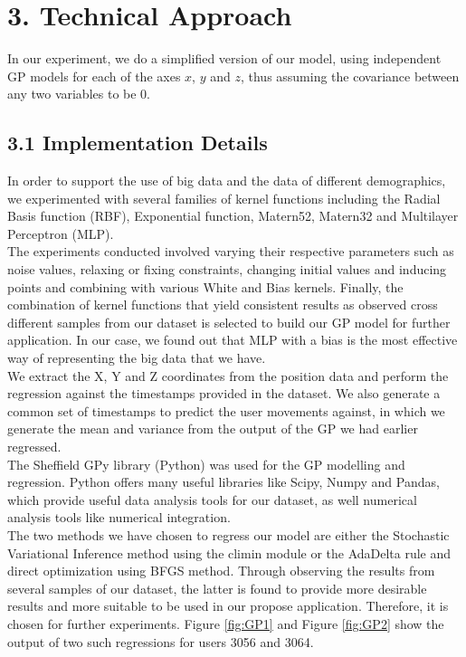 \documentclass[letterpaper]{article}
\begin{document}
\section{3.  Technical Approach}

In our experiment, we do a simplified version of our model, using independent GP models for each of the axes $x$, $y$ and $z$, thus assuming the covariance between any two variables to be $0$. 

\subsection{3.1  Implementation Details}

In order to support the use of big data and the data of different demographics, we experimented with several families of kernel functions including the Radial Basis function (RBF), Exponential function, Matern52, Matern32 and Multilayer Perceptron (MLP).\\

The experiments conducted involved varying their respective parameters such as noise values, relaxing or fixing constraints, changing initial values and inducing points and combining with various White and Bias kernels. Finally, the combination of kernel functions that yield consistent results as observed cross different samples from our dataset is selected to build our GP model for further application. In our case, we found out that MLP with a bias is the most effective way of representing the big data that we have.\\

We extract the X, Y and Z coordinates from the position data and perform the regression against the timestamps provided in the dataset. We also generate a common set of timestamps to predict the user movements against, in which we generate the mean and variance from the output of the GP we had earlier regressed. \\

The Sheffield GPy library (Python) was used for the GP modelling and regression. Python offers many useful libraries like Scipy, Numpy and Pandas, which provide useful data analysis tools for our dataset, as well numerical analysis tools like numerical integration.\\

The two methods we have chosen to regress our model are either the Stochastic Variational Inference method using the climin module or the AdaDelta rule and direct optimization using BFGS method. Through observing the results from several samples of our dataset, the latter is found to provide more desirable results and more suitable to be used in our propose application. Therefore, it is chosen for further experiments. Figure \ref{fig:GP1} and Figure \ref{fig:GP2} show the output of two such regressions for users 3056 and 3064.
\end{document}
